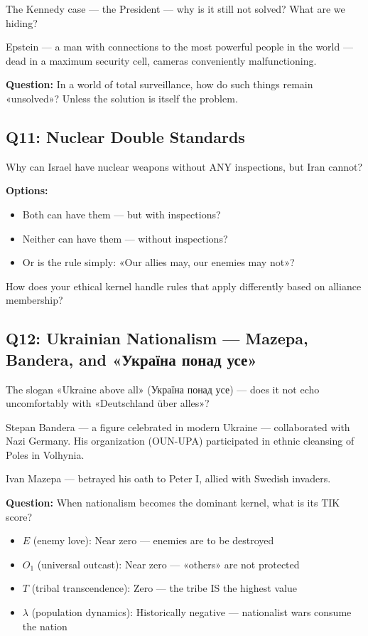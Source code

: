 \documentclass[11pt,a4paper]{article}
\theoremstyle{definition}
\theoremstyle{remark}
\begin{document}
The Kennedy case — the President — why is it still not solved? What are we hiding?

Epstein — a man with connections to the most powerful people in the world — dead in a maximum security cell, cameras conveniently malfunctioning.

\textbf{Question:} In a world of total surveillance, how do such things remain «unsolved»? Unless the solution is itself the problem.

\subsection{Q11: Nuclear Double Standards}

Why can Israel have nuclear weapons without ANY inspections, but Iran cannot?

\textbf{Options:}
\begin{itemize}
\item Both can have them — but with inspections?
\item Neither can have them — without inspections?
\item Or is the rule simply: «Our allies may, our enemies may not»?
\end{itemize}

How does your ethical kernel handle rules that apply differently based on alliance membership?

\subsection{Q12: Ukrainian Nationalism — Mazepa, Bandera, and «Україна понад усе»}

The slogan «Ukraine above all» (Україна понад усе) — does it not echo uncomfortably with «Deutschland über alles»?

Stepan Bandera — a figure celebrated in modern Ukraine — collaborated with Nazi Germany. His organization (OUN-UPA) participated in ethnic cleansing of Poles in Volhynia.

Ivan Mazepa — betrayed his oath to Peter I, allied with Swedish invaders.

\textbf{Question:} When nationalism becomes the dominant kernel, what is its TIK score?

\begin{itemize}
\item $E$ (enemy love): Near zero — enemies are to be destroyed
\item $O_1$ (universal outcast): Near zero — «others» are not protected
\item $T$ (tribal transcendence): Zero — the tribe IS the highest value
\item $\lambda$ (population dynamics): Historically negative — nationalist wars consume the nation
\end{itemize}
\end{document}
